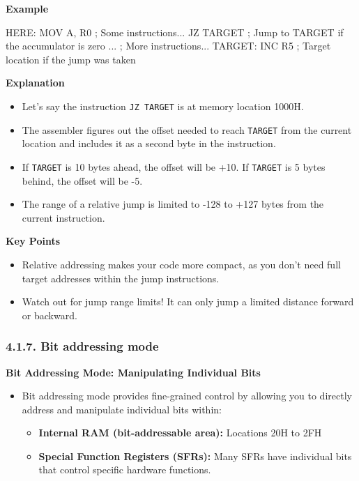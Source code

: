 \documentclass[
]{article}
\newenvironment{Shaded}{}{}
\newcommand{\NormalTok}[1]{#1}
\begin{document}
\textbf{Example}

\begin{Shaded}
\begin{Highlighting}[]
\NormalTok{HERE:   MOV A, R0   ; Some instructions...}
\NormalTok{        JZ  TARGET  ; Jump to \textquotesingle{}TARGET\textquotesingle{} if the accumulator is zero}
\NormalTok{        ...         ; More instructions...}
\NormalTok{TARGET: INC R5      ; Target location if the jump was taken}
\end{Highlighting}
\end{Shaded}

\textbf{Explanation}

\begin{itemize}
\item
  Let's say the instruction \texttt{JZ\ TARGET} is at memory location
  1000H.
\item
  The assembler figures out the offset needed to reach \texttt{TARGET}
  from the current location and includes it as a second byte in the
  instruction.
\item
  If \texttt{TARGET} is 10 bytes ahead, the offset will be +10. If
  \texttt{TARGET} is 5 bytes behind, the offset will be -5.
\item
  The range of a relative jump is limited to -128 to +127 bytes from the
  current instruction.
\end{itemize}

\textbf{Key Points}

\begin{itemize}
\item
  Relative addressing makes your code more compact, as you don't need
  full target addresses within the jump instructions.
\item
  Watch out for jump range limits! It can only jump a limited distance
  forward or backward.
\end{itemize}

\hypertarget{417-bit-addressing-mode}{%
\subsubsection{4.1.7. Bit addressing
mode}\label{417-bit-addressing-mode}}

\textbf{Bit Addressing Mode: Manipulating Individual Bits}

\begin{itemize}
\item
  Bit addressing mode provides fine-grained control by allowing you to
  directly address and manipulate individual bits within:

  \begin{itemize}
  \item
    \textbf{Internal RAM (bit-addressable area):} Locations 20H to 2FH
  \item
    \textbf{Special Function Registers (SFRs): } Many SFRs have
    individual bits that control specific hardware functions.
  \end{itemize}
\end{itemize}
\end{document}
